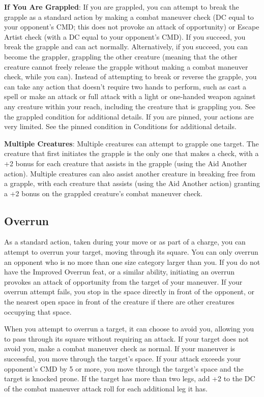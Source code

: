 \textbf{If You Are Grappled}: If you are grappled, you can attempt to break the grapple as a standard action by making a combat maneuver check (DC equal to your opponent's CMD; this does not provoke an attack of opportunity) or Escape Artist check (with a DC equal to your opponent's CMD). If you succeed, you break the grapple and can act normally. Alternatively, if you succeed, you can become the grappler, grappling the other creature (meaning that the other creature cannot freely release the grapple without making a combat maneuver check, while you can). Instead of attempting to break or reverse the grapple, you can take any action that doesn't require two hands to perform, such as cast a spell or make an attack or full attack with a light or one-handed weapon against any creature within your reach, including the creature that is grappling you. See the grappled condition for additional details. If you are pinned, your actions are very limited. See the pinned condition in Conditions for additional details.
				
\textbf{Multiple Creatures}: Multiple creatures can attempt to grapple one target. The creature that first initiates the grapple is the only one that makes a check, with a +2 bonus for each creature that assists in the grapple (using the Aid Another action). Multiple creatures can also assist another creature in breaking free from a grapple, with each creature that assists (using the Aid Another action) granting a +2 bonus on the grappled creature's combat maneuver check.
				
\subsection{Overrun}

				
As a standard action, taken during your move or as part of a charge, you can attempt to overrun your target, moving through its square. You can only overrun an opponent who is no more than one size category larger than you. If you do not have the Improved Overrun feat, or a similar ability, initiating an overrun provokes an attack of opportunity from the target of your maneuver. If your overrun attempt fails, you stop in the space directly in front of the opponent, or the nearest open space in front of the creature if there are other creatures occupying that space.
				
When you attempt to overrun a target, it can choose to avoid you, allowing you to pass through its square without requiring an attack. If your target does not avoid you, make a combat maneuver check as normal. If your maneuver is successful, you move through the target's space. If your attack exceeds your opponent's CMD by 5 or more, you move through the target's space and the target is knocked prone. If the target has more than two legs, add +2 to the DC of the combat maneuver attack roll for each additional leg it has.
				
